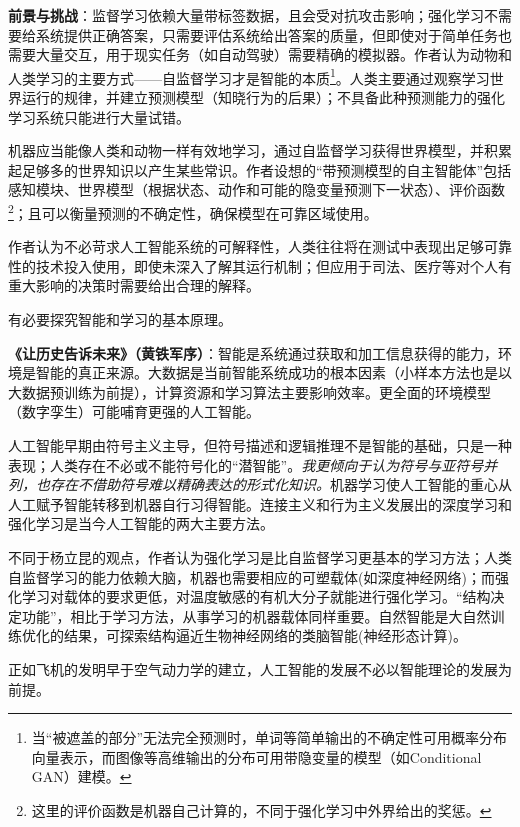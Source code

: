 \par \textbf{前景与挑战}：监督学习依赖大量带标签数据，且会受对抗攻击影响；强化学习不需要给系统提供正确答案，只需要评估系统给出答案的质量，但即使对于简单任务也需要大量交互，用于现实任务（如自动驾驶）需要精确的模拟器。作者认为动物和人类学习的主要方式——自监督学习才是智能的本质\footnote{当“被遮盖的部分”无法完全预测时，单词等简单输出的不确定性可用概率分布向量表示，而图像等高维输出的分布可用带隐变量的模型（如Conditional GAN）建模。}。人类主要通过观察学习世界运行的规律，并建立预测模型（知晓行为的后果）；不具备此种预测能力的强化学习系统只能进行大量试错。

\par 机器应当能像人类和动物一样有效地学习，通过自监督学习获得世界模型，并积累起足够多的世界知识以产生某些常识。作者设想的“带预测模型的自主智能体”包括感知模块、世界模型（根据状态、动作和可能的隐变量预测下一状态）、评价函数\footnote{这里的评价函数是机器自己计算的，不同于强化学习中外界给出的奖惩。}；且可以衡量预测的不确定性，确保模型在可靠区域使用。

\par 作者认为不必苛求人工智能系统的可解释性，人类往往将在测试中表现出足够可靠性的技术投入使用，即使未深入了解其运行机制；但应用于司法、医疗等对个人有重大影响的决策时需要给出合理的解释。

\par 有必要探究智能和学习的基本原理。

\par \textbf{《让历史告诉未来》（黄铁军序）}：智能是系统通过获取和加工信息获得的能力，环境是智能的真正来源。大数据是当前智能系统成功的根本因素（小样本方法也是以大数据预训练为前提），计算资源和学习算法主要影响效率。更全面的环境模型（数字孪生）可能哺育更强的人工智能。
\par 人工智能早期由符号主义主导，但符号描述和逻辑推理不是智能的基础，只是一种表现；人类存在不必或不能符号化的“潜智能”。\emph{我更倾向于认为符号与亚符号并列，也存在不借助符号难以精确表达的形式化知识。}机器学习使人工智能的重心从人工赋予智能转移到机器自行习得智能。连接主义和行为主义发展出的深度学习和强化学习是当今人工智能的两大主要方法。
\par 不同于杨立昆的观点，作者认为强化学习是比自监督学习更基本的学习方法；人类自监督学习的能力依赖大脑，机器也需要相应的可塑载体(如深度神经网络)；而强化学习对载体的要求更低，对温度敏感的有机大分子就能进行强化学习。“结构决定功能”，相比于学习方法，从事学习的机器载体同样重要。自然智能是大自然训练优化的结果，可探索结构逼近生物神经网络的类脑智能(神经形态计算)。
\par 正如飞机的发明早于空气动力学的建立，人工智能的发展不必以智能理论的发展为前提。